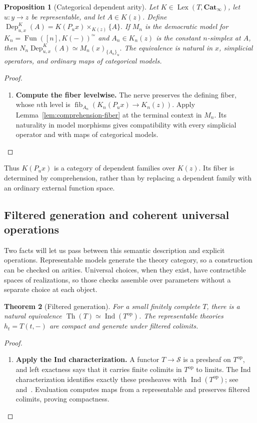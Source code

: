 \documentclass[oneside]{article}
\theoremstyle{plain}
\newtheorem{theorem}{Theorem}[section]
\newtheorem{proposition}[theorem]{Proposition}
\theoremstyle{definition}
\theoremstyle{remark}
\newcommand{\Cat}{\mathbf{Cat}_{\infty}}
\newcommand{\Dep}{\operatorname{Dep}}
\newcommand{\Fun}{\operatorname{Fun}}
\newcommand{\Lex}{\operatorname{Lex}}
\newcommand{\Sps}{\mathcal S}
\newcommand{\Th}{\operatorname{Th}}
\newcommand{\core}{\simeq}
\newcommand{\fib}{\operatorname{fib}}
\newcommand{\op}{\mathrm{op}}
\begin{document}
\begin{proposition}[Categorical dependent arity]
\label{prop:polynomial-arity}
    Let $K\in\Lex(T,\Cat)$, let $u:y\to z$ be representable, and let $A\in K(z)$. Define $\Dep^K_{u,x}(A)=K(P_ux)\times_{K(z)}\{A\}.$ If $M_n$ is the democratic model for $K_n=\Fun([n],K(-))^\core$ and $A_n\in K_n(z)$ is the constant $n$-simplex at $A$, then $N_n\Dep^K_{u,x}(A)\simeq M_n(x)_{\{A_n\}_u}.$ The equivalence is natural in $x$, simplicial operators, and ordinary maps of categorical models.
\end{proposition}
\begin{proof}
\leavevmode
    \begin{enumerate}
        \item \textbf{Compute the fiber levelwise.} The nerve preserves the defining fiber, whose $n$th level is $\fib_{A_n}(K_n(P_ux)\to K_n(z))$. Apply Lemma~\ref{lem:comprehension-fiber} at the terminal context in $M_n$. Its naturality in model morphisms gives compatibility with every simplicial operator and with maps of categorical models.\qedhere
    \end{enumerate}
\end{proof}

Thus $K(P_ux)$ is a category of dependent families over $K(z)$. Its fiber is determined by comprehension, rather than by replacing a dependent family with an ordinary external function space.


\subsection{Filtered generation and coherent universal operations}
\label{subsec:filtered-generation-universal-operations}

Two facts will let us pass between this semantic description and explicit
operations. Representable models generate the theory category, so a
construction can be checked on arities. Universal choices, when they
exist, have contractible spaces of realizations, so those checks assemble
over parameters without a separate choice at each object.

\begin{theorem}[Filtered generation]
\label{thm:Th-filtered-colimit-generation}
    For a small finitely complete $T$, there is a natural equivalence $\Th(T)\simeq\operatorname{Ind}(T^{\op})$. The representable theories $h_t=T(t,-)$ are compact and generate under filtered colimits.
\end{theorem}
\begin{proof}
    \leavevmode
    \begin{enumerate}
        \item \textbf{Apply the Ind characterization.} A functor $T\to\Sps$ is a presheaf on $T^{\op}$, and left exactness says that it carries finite colimits in $T^{\op}$ to limits. The Ind characterization identifies exactly these presheaves with $\operatorname{Ind}(T^{\op})$; see~\cite[\S5.3.5]{Lurie2009} and~\cite[Definition~3.13]{NguyenUemura2025}. Evaluation computes maps from a representable and preserves filtered colimits, proving compactness.\qedhere
    \end{enumerate}
\end{proof}
\end{document}
